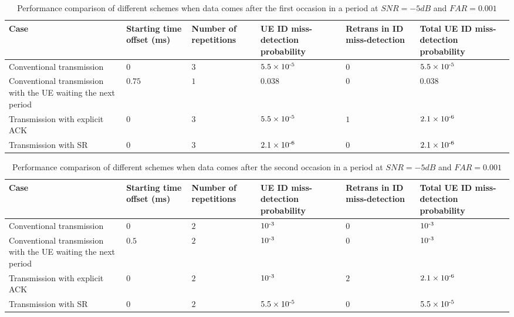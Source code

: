 \documentclass[conference]{IEEEtran}
\begin{document}
\begin{table}[htbp]
\caption{Performance comparison of different schemes when data comes after the first occasion in a period at $SNR = -5dB$ and $FAR = 0.001$}
\begin{center}
\begin{tabular}{|p{6em}|p{3em}|p{3em}|p{3.2em}|p{3.2em}|p{3.2em}|}
 \hline
 \textbf{Case} & \textbf{Starting time offset (ms)}&\textbf{Number of repetitions}&\textbf{UE ID miss-detection probability}&\textbf{Retrans in ID miss-detection}&\textbf{Total UE ID miss-detection probability}\\
 \hline
 Conventional transmission&$0$&$3$&$5.5\times10\textsuperscript{-5}$&$0$&$5.5\times10\textsuperscript{-5}$\\
 \hline
 Conventional transmission with the UE waiting the next period&$0.75$&$1$&$0.038$&$0$&$0.038$\\
 \hline
Transmission with explicit ACK&$0$&$3$&$5.5\times10\textsuperscript{-5}$&$1$&$2.1\times10\textsuperscript{-6}$\\
\hline
Transmission with SR&$0$&$3$&$2.1\times10\textsuperscript{-6}$&$0$&$2.1\times10\textsuperscript{-6}$\\
 \hline
\end{tabular}
\label{tab3}
\end{center}
\vspace{-3mm}
\end{table}

\begin{table}[htbp]
\caption{Performance comparison of different schemes when data comes after the second occasion in a period at $SNR = -5dB$ and $FAR = 0.001$}
\begin{center}
\begin{tabular}{|p{6em}|p{3em}|p{3em}|p{3.2em}|p{3.2em}|p{3.2em}|}
 \hline
 \textbf{Case} & \textbf{Starting time offset (ms)}&\textbf{Number of repetitions}&\textbf{UE ID miss-detection probability}&\textbf{Retrans in ID miss-detection}&\textbf{Total UE ID miss-detection probability}\\
 \hline
 Conventional transmission&$0$&$2$&$10\textsuperscript{-3}$&$0$&$10\textsuperscript{-3}$\\
 \hline
 Conventional transmission with the UE waiting the next period&$0.5$&$2$&$10\textsuperscript{-3}$&$0$&$10\textsuperscript{-3}$\\
 \hline
Transmission with explicit ACK&$0$&$2$&$10\textsuperscript{-3}$&$2$&$2.1\times10\textsuperscript{-6}$\\
\hline
Transmission with SR&$0$&$2$&$5.5\times10\textsuperscript{-5}$&$0$&$5.5\times10\textsuperscript{-5}$\\
 \hline
\end{tabular}
\label{tab4}
\end{center}
\vspace{-3mm}
\end{table}
\end{document}
